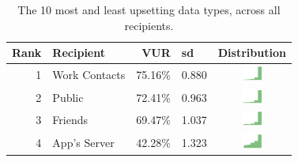 \begin{table}[t]
\begin{center}
\small
\begin{tabular}{| r | l | r | l |c |}
\hline
Rank & Recipient & VUR & sd & Distribution \\
\hline
1 & Work Contacts & 75.16\% & 0.880 & \includegraphics[width = 2cm, height = 0.5cm]{tex-inputs/recipient4/recipient_work} \\
2 & Public & 72.41\% & 0.963 & \includegraphics[width = 2cm, height = 0.5cm]{tex-inputs/recipient4/recipient_pub}  \\
3 & Friends & 69.47\% & 1.037 & \includegraphics[width = 2cm, height = 0.5cm]{tex-inputs/recipient4/recipient_friends}\\
4 & App's Server & 42.28\% & 1.323 & \includegraphics[width = 2cm, height = 0.5cm]{tex-inputs/recipient4/recipient_app}\\
\hline
\end{tabular}
\caption{The 10 most and least upsetting data types, across all recipients.}
\label{recipient-table}
\end{center}
\end{table}

